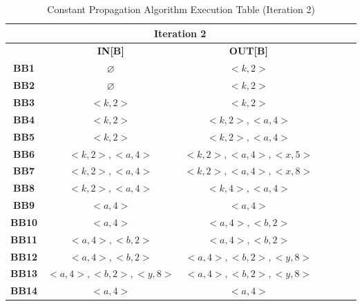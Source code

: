 \documentclass{article}
\begin{document}
\begin{table}[H]
	\centering
	\begin{tabular}{|c|c|c|c|c|c|c|}
		\hline
		              & \multicolumn{2}{c|}{\textbf{Iteration 2}}                           \\ \hline
		              & \textbf{IN[B]}                            & \textbf{OUT[B]}         \\ \hline
		\textbf{BB1}  & $\varnothing$                             & $<k,2>$                 \\ \hline
		\textbf{BB2}  & $\varnothing$                             & $<k,2>$                 \\ \hline
		\textbf{BB3}  & $<k,2>$                                   & $<k,2>$                 \\ \hline
		\textbf{BB4}  & $<k,2>$                                   & $<k,2>, <a, 4>$         \\ \hline
		\textbf{BB5}  & $<k,2>$                                   & $<k,2>, <a, 4>$         \\ \hline
		\textbf{BB6}  & $<k,2>, <a, 4>$                           & $<k,2>, <a, 4>, <x, 5>$ \\ \hline
		\textbf{BB7}  & $<k,2>, <a, 4>$                           & $<k,2>, <a, 4>, <x, 8>$ \\ \hline
		\textbf{BB8}  & $<k,2>, <a, 4>$                           & $<k,4>, <a, 4>$         \\ \hline
		\textbf{BB9}  & $<a, 4>$                                  & $<a, 4>$                \\ \hline
		\textbf{BB10} & $ <a, 4>$                                 & $<a, 4>, <b,2>$         \\ \hline
		\textbf{BB11} & $ <a, 4>, <b,2>$                          & $<a, 4>, <b,2>$         \\ \hline
		\textbf{BB12} & $<a, 4>, <b,2>$                           & $<a, 4>, <b,2>, <y,8>$  \\ \hline
		\textbf{BB13} & $<a, 4>, <b,2>, <y,8>$                    & $<a, 4>, <b,2>, <y,8>$  \\ \hline
		\textbf{BB14} & $ <a, 4>$                                 & $<a, 4>$                \\ \hline
	\end{tabular}
	\caption{Constant Propagation Algorithm Execution Table (Iteration 2)}
\end{table}
\end{document}
